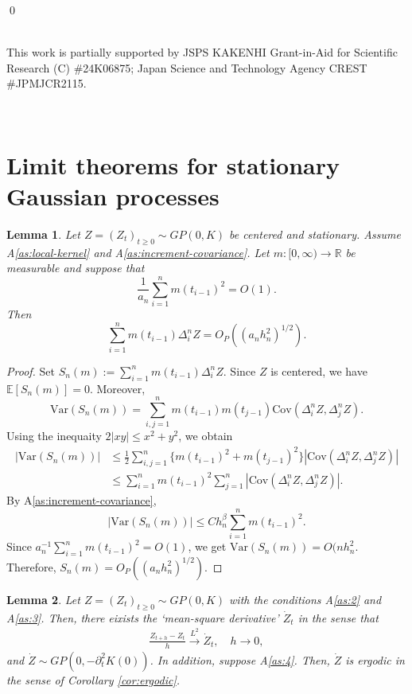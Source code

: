 \documentclass[a4paper,10pt,twoside]{article}
\newtheorem{lem}{Lemma}[section]
\numberwithin{equation}{section}
\def\l{\left}
\def\r{\right}
\def\p{\partial}
\def\E{\mathbb{E}}
\def\Var{\mathrm{Var}}
\def\Cov{\mathrm{Cov}}
\begin{document}
\qed



\ \vspace{1cm}\ \\
This work is partially supported by JSPS KAKENHI Grant-in-Aid for Scientific Research (C) \#24K06875; Japan Science and Technology Agency CREST \#JPMJCR2115. 

\
\appendix
\section{Limit theorems for stationary Gaussian processes}\label{app:A}

\begin{lem}\label{lem:m-DZ}
Let $Z=(Z_t)_{t\ge0}\sim GP(0,K)$ be centered and stationary.
Assume A\ref{as:local-kernel} and A\ref{as:increment-covariance}.
Let $m:[0,\infty)\to\mathbb{R}$ be measurable and suppose that
\[
\frac1{a_n}\sum_{i=1}^n m(t_{i-1})^2=O(1).
\]
Then
\[
\sum_{i=1}^n m(t_{i-1})\Delta_i^nZ=O_P\left((a_nh_n^2)^{1/2}\right).
\]
\end{lem}

\begin{proof}
Set $S_n(m):=\sum_{i=1}^n m(t_{i-1})\Delta_i^nZ$.
Since $Z$ is centered, we have $\E[S_n(m)]=0$.
Moreover,
\[
\Var(S_n(m))=\sum_{i,j=1}^n m(t_{i-1})m(t_{j-1})\Cov(\Delta_i^nZ,\Delta_j^nZ).
\]
Using the inequaity $2|xy|\le x^2+y^2$, we obtain
\begin{align*}
|\Var(S_n(m))|&\le \frac12\sum_{i,j=1}^n \{m(t_{i-1})^2+m(t_{j-1})^2\}\left|\Cov(\Delta_i^nZ,\Delta_j^nZ)\right| \\
&\le \sum_{i=1}^n m(t_{i-1})^2\sum_{j=1}^n \left|\Cov(\Delta_i^nZ,\Delta_j^nZ)\right|. 
\end{align*}
By A\ref{as:increment-covariance},
\[
|\Var(S_n(m))|\le C h_n^\beta\sum_{i=1}^n m(t_{i-1})^2.
\]
Since $a_n^{-1}\sum_{i=1}^n m(t_{i-1})^2=O(1)$, we get $\Var(S_n(m))=O(nh_n^2$.
Therefore, $S_n(m)=O_P((a_nh_n^2)^{1/2})$.
\end{proof}



\begin{lem}\label{lem:diff-L2}
Let $Z = (Z_t)_{t \ge 0} \sim GP(0,K)$ with the conditions A\ref{as:2} and A\ref{as:3}. 
Then, there eixists the `mean-square derivative' $\dot{Z}_t$ in the sense that 
\begin{align}
\frac{Z_{t+h} - Z_t}{h} \stackrel{L^2}{\longrightarrow} \dot{Z}_t,\quad h\to 0, \label{diff-L2}
\end{align}
and $\dot{Z} \sim GP\l(0, -\p^2_t K(0)\r)$. In addition, suppose A\ref{as:4}. Then, $\dot{Z}$ is ergodic in the sense of Corollary  \ref{cor:ergodic}.
\end{lem}
\end{document}

